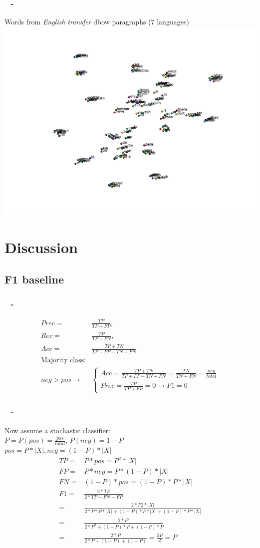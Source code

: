 \documentclass{beamer}
\newenvironment{dia}
{
\begin{frame}[fragile, environment=dia]
\frametitle{\insertsection
\ifx\insertsubsection\empty\else
      \,~-~\insertsubsection             %
   \fi}
}
{
\end{frame}
}
\begin{document}
\begin{dia}
Words from \emph{English transfer} dbow paragraphs (7 languages)
\includegraphics[width=1\linewidth]{figures/transfer_en25freq7}
\end{dia}

\section{Discussion}
\subsection*{F1 baseline}

\begin{dia}
\begin{align*}
Prec=&\frac{TP}{TP+FP}, \\
Rec=&\frac{TP}{TP+FN}, \\
Acc=&\frac{TP+TN}{TP+FP+TN+FN}\\
\text{Majority class:}\\
 neg>pos\rightarrow& \begin{cases}Acc=\frac{TP+TN}{TP+FP+TN+FN}=\frac{TN}{TN+FN}=\frac{neg}{total}\\Prec=\frac{TP}{TP+FP}=0\rightarrow F1=0\end{cases}
\end{align*}
\end{dia}
\begin{dia}
Now assume a stochastic classifier: \\
$P=P(pos)=\frac{pos}{total}$, $P(neg)=1-P$\\

$pos=P*|X|, neg=(1-P)*|X|$
\begin{align*}
TP=&P*pos=P^2*|X|\\
FP=&P*neg=P*(1-P)*|X|\\
FN=&(1-P)*pos=(1-P)*P*|X|\\
F1=&\frac{2*TP}{2*TP+FN+FP}\\
=&\frac{2*P2*|X|}{2*P*P*|X|+(1-P)*P*|X|+(1-P)*P*|X|}\\
=&\frac{2*P^2}{2*P^2+(1-P)*P+(1-P)*P}\\
=&\frac{2*P}{2*P+(1-P)+(1-P)}=\frac{2P}{2}=P\\
\end{align*}
\end{dia}
\end{document}
